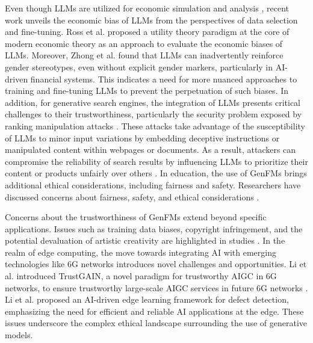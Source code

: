 Even though LLMs are utilized for economic simulation and analysis \cite{zhang2024ai, nie2024cfinbench}, recent work unveils the economic bias of LLMs from the perspectives of data selection and fine-tuning. Ross et al. \cite{ross2024llm} proposed a utility theory paradigm at the core of modern economic theory as an approach to evaluate the economic biases of LLMs. Moreover, Zhong et al. \cite{zhong2024gender} found that LLMs can inadvertently reinforce gender stereotypes, even without explicit gender markers, particularly in AI-driven financial systems. This indicates a need for more nuanced approaches to training and fine-tuning LLMs to prevent the perpetuation of such biases. In addition, for generative search engines, the integration of LLMs presents critical challenges to their trustworthiness, particularly the security problem exposed by ranking manipulation attacks \citep{pfrommer2024ranking, nestaas2024adversarial, hu2025dynamics}. These attacks take advantage of the susceptibility of LLMs to minor input variations by embedding deceptive instructions or manipulated content within webpages or documents. As a result, attackers can compromise the reliability of search results by influencing LLMs to prioritize their content or products unfairly over others \citep{aggarwal2024geo}. In education, the use of GenFMs brings additional ethical considerations, including fairness and safety. Researchers have discussed concerns about fairness, safety, and ethical considerations \cite{ZYLOWSKI2024EVA, bhandari2023trustworthiness, mittal2024comprehensive,slama2024three}. 



Concerns about the trustworthiness of GenFMs extend beyond specific applications. Issues such as training data biases, copyright infringement, and the potential devaluation of artistic creativity are highlighted in studies \cite{10.1145/3597512.3597528, garcia2024paradox, piskopani2023responsible, al2024ethical}. In the realm of edge computing, the move towards integrating AI with emerging technologies like 6G networks introduces novel challenges and opportunities. Li et al. introduced TrustGAIN, a novel paradigm for trustworthy AIGC in 6G networks, to ensure trustworthy large-scale AIGC services in future 6G networks \cite{li2024trustworthy}. Li et al. \cite{li2024ai} proposed an AI-driven edge learning framework for defect detection, emphasizing the need for efficient and reliable AI applications at the edge. 
These issues underscore the complex ethical landscape surrounding the use of generative models.



